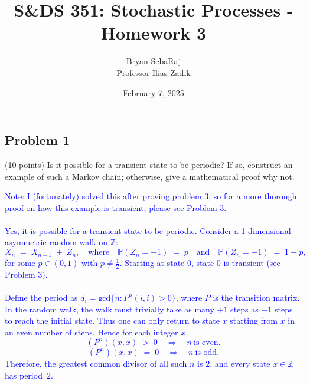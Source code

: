 \documentclass{article}
\title{S\&DS 351: Stochastic Processes - Homework 3}
\author{Bryan SebaRaj \\[0.8em] Professor Ilias Zadik}
\date{February 7, 2025}
\begin{document}
\maketitle

\subsection*{Problem 1} (10 points) Is it possible for a transient state to be periodic? If so, construct an example of such a Markov chain; otherwise, give a mathematical proof why not.

\textcolor{blue}{Note: I (fortunately) solved this after proving problem 3, so for a more thorough proof on how this example is transient, please see Problem 3. \\ \\ 
Yes, it is possible for a transient state to be periodic. Consider a 1-dimensional asymmetric random walk on $\mathbb{Z}$:
\[
   X_{n} \;=\; X_{n-1} \;+\; Z_n,
   \quad\text{where}\quad
   \mathbb{P}(Z_n = +1) \;=\; p
   \quad\text{and}\quad
   \mathbb{P}(Z_n = -1) \;=\; 1 - p,
\]
for some $p \in (0,1)$ with $p \neq \tfrac{1}{2}$. Starting at state 0, state 0 is transient (see Problem 3). \\ \\ 
\smallskip
\noindent
Define the period as $d_i = \text{gcd}\{n:P^n(i,i)>0\}$, where $P$ is the transition matrix. \\
In the random walk, the walk must trivially take as many $+1$ steps as $-1$ steps to reach the initial state. Thus one can only return to state $x$ starting from $x$ in an even number of steps. Hence for each integer $x$, 
\[
  (P^n)(x,x) \;>\;0 
  \quad\Longrightarrow\quad 
  n \ \text{is even}.
\]
\[
  (P^n)(x,x) \;=\;0 
  \quad\Longrightarrow\quad 
  n \ \text{is odd}.
\]
Therefore, the greatest common divisor of all such $n$ is $2$, and every state $x\in\mathbb{Z}$ has period~$2$.
}
   
\end{document}
